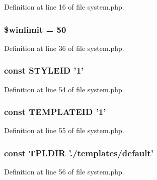 Definition at line 16 of file system.\+php.

\hypertarget{system_8php_a01e2b9fb5d1ed424d631e4e3359f5c51}{
\subsubsection[{\$winlimit}]{\setlength{\rightskip}{0pt plus 5cm}\$winlimit = 50}}\label{system_8php_a01e2b9fb5d1ed424d631e4e3359f5c51}


Definition at line 36 of file system.\+php.

\hypertarget{system_8php_a44c99c5ea9011ae4269df6a6f183e0f9}{
\subsubsection[{S\+T\+Y\+L\+E\+I\+D}]{\setlength{\rightskip}{0pt plus 5cm}const S\+T\+Y\+L\+E\+I\+D '1'}}\label{system_8php_a44c99c5ea9011ae4269df6a6f183e0f9}


Definition at line 54 of file system.\+php.

\hypertarget{system_8php_abb9280feb515c6b25482a31caaf87450}{
\subsubsection[{T\+E\+M\+P\+L\+A\+T\+E\+I\+D}]{\setlength{\rightskip}{0pt plus 5cm}const T\+E\+M\+P\+L\+A\+T\+E\+I\+D '1'}}\label{system_8php_abb9280feb515c6b25482a31caaf87450}


Definition at line 55 of file system.\+php.

\hypertarget{system_8php_abbbdebc91409601dbe1d4e83187021da}{
\subsubsection[{T\+P\+L\+D\+I\+R}]{\setlength{\rightskip}{0pt plus 5cm}const T\+P\+L\+D\+I\+R './templates/default'}}\label{system_8php_abbbdebc91409601dbe1d4e83187021da}


Definition at line 56 of file system.\+php.


